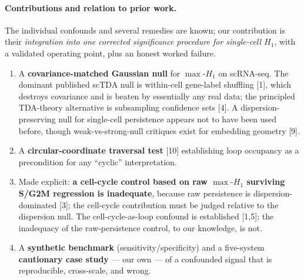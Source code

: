 \documentclass[11pt,a4paper]{article}
\newcommand{\maxh}{\ensuremath{\max\text{-}H_1}}
\begin{document}
\paragraph{Contributions and relation to prior work.} The individual confounds and several remedies
are known; our contribution is their \emph{integration into one corrected significance procedure for
single-cell $H_1$}, with a validated operating point, plus an honest worked failure.
\begin{enumerate}[leftmargin=1.4em,itemsep=1pt]
\item A \textbf{covariance-matched Gaussian null} for \maxh{} on scRNA-seq. The dominant published
scTDA null is within-cell gene-label shuffling [1], which destroys covariance and is beaten by
essentially any real data; the principled TDA-theory alternative is subsampling confidence sets
[4]. A dispersion-preserving null for single-cell persistence appears not to have been used before,
though weak-vs-strong-null critiques exist for embedding geometry [9].
\item A \textbf{circular-coordinate traversal test} [10] establishing loop occupancy as a
precondition for any ``cyclic'' interpretation.
\item Made explicit: \textbf{a cell-cycle control based on raw \maxh{} surviving S/G2M regression is
inadequate}, because raw persistence is dispersion-dominated [3]; the cell-cycle contribution must
be judged relative to the dispersion null. The cell-cycle-as-loop confound is established [1,5]; the
inadequacy of the raw-persistence control, to our knowledge, is not.
\item A \textbf{synthetic benchmark} (sensitivity/specificity) and a five-system \textbf{cautionary
case study} --- our own --- of a confounded signal that is reproducible, cross-scale, and wrong.
\end{enumerate}
\end{document}
